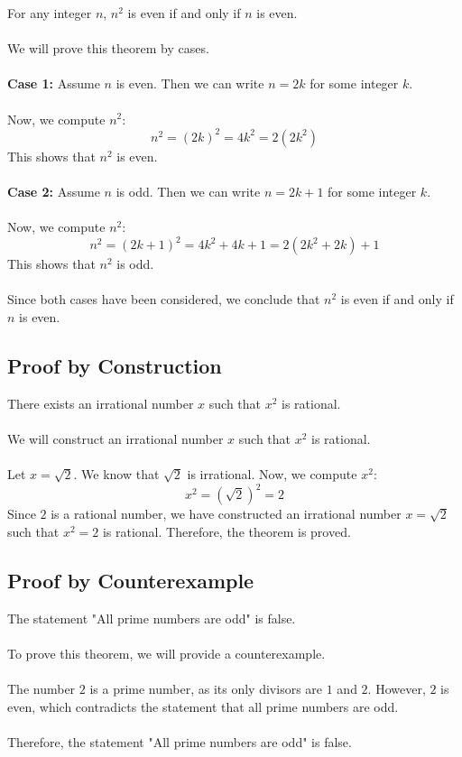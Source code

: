 For any integer \( n \), \( n^2 \) is even if and only if \( n \) is even.
\\\\
	We will prove this theorem by cases.
\\\\
	\textbf{Case 1:} Assume \( n \) is even. Then we can write \( n = 2k \) for some integer \( k \).
\\\\
	Now, we compute \( n^2 \):
	\[
		n^2 = (2k)^2 = 4k^2 = 2(2k^2)
	\]
	This shows that \( n^2 \) is even.
\\\\
	\textbf{Case 2:} Assume \( n \) is odd. Then we can write \( n = 2k + 1 \) for some integer \( k \).
\\\\
	Now, we compute \( n^2 \):
	\[
		n^2 = (2k + 1)^2 = 4k^2 + 4k + 1 = 2(2k^2 + 2k) + 1
	\]
	This shows that \( n^2 \) is odd.
\\\\
	Since both cases have been considered, we conclude that \( n^2 \) is even if and only if \( n \) is even.
\QED

\subsection{Proof by Construction}

There exists an irrational number \( x \) such that \( x^2 \) is rational.
\\\\
	We will construct an irrational number \( x \) such that \( x^2 \) is rational.
\\\\
	Let \( x = \sqrt{2} \). We know that \( \sqrt{2} \) is irrational. Now, we compute \( x^2 \):
	\[
		x^2 = (\sqrt{2})^2 = 2
	\]
	Since \( 2 \) is a rational number, we have constructed an irrational number \( x = \sqrt{2} \) such that \( x^2 = 2 \) is rational.
	Therefore, the theorem is proved.

\QED

\subsection{Proof by Counterexample}

The statement "All prime numbers are odd" is false.
\\\\
	To prove this theorem, we will provide a counterexample.
\\\\
	The number \( 2 \) is a prime number, as its only divisors are \( 1 \) and \( 2 \). However, \( 2 \) is even, which contradicts the statement that all prime numbers are odd.
\\\\
	Therefore, the statement "All prime numbers are odd" is false.
\QED

